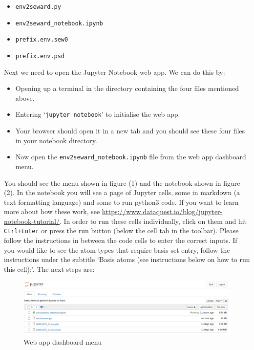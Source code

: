 \begin{itemize}
	\item \texttt{env2seward.py}
	\item \texttt{env2seward\_notebook.ipynb}
	\item \texttt{prefix.env.sew0}
	\item \texttt{prefix.env.psd}
\end{itemize}
Next we need to open the Jupyter Notebook web app. We can do this by:

\begin{itemize}
	\item Opening up a terminal in the directory containing the four files mentioned above.
	\item Entering `\texttt{jupyter notebook}' to initialise the web app.
	\item Your browser should open it in a new tab and you should see these four files in your notebook directory.
	\item Now open the \texttt{env2seward\_notebook.ipynb} file from the web app dashboard menu.
\end{itemize}

You should see the menu shown in figure (1) and the notebook shown in figure (2). In the notebook you will see a page of Jupyter cells, some in markdown (a text formatting language) and some to run python3 code. If you want to learn more about how these work, see \url{https://www.dataquest.io/blog/jupyter-notebook-tutorial/}. In order to run these cells individually, click on them and hit \texttt{Ctrl+Enter} or press the run button (below the cell tab in the toolbar). 
Please follow the instructions in between the code cells to enter the correct inputs. If you would like to see the atom-types that require basis set entry, follow the instructions under the subtitle `Basis atoms (see instructions below on how to run this cell):'. The next steps are:

\begin{figure}
	\centering
	\includegraphics[width=1.3\linewidth]{../manuals/e2s_disp_manual/dashboard.png}
	\caption{Web app dashboard menu}
	\label{fig:screenshot-from-2020-06-23-12-26-13}
\end{figure}

